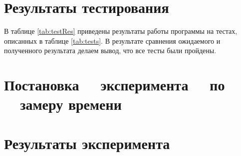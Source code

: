\section{Результаты тестирования}

В таблице \ref{tab:testRes} приведены результаты работы программы на тестах,
описанных в таблице \ref{tab:tests}. В результате сравнения ожидаемого и
полученного результата делаем вывод, что все тесты были пройдены.


\section[Постановка эксперимента по замеру времени]
        {Постановка ~~эксперимента ~~по ~~замеру времени}


\section{Результаты эксперимента}

